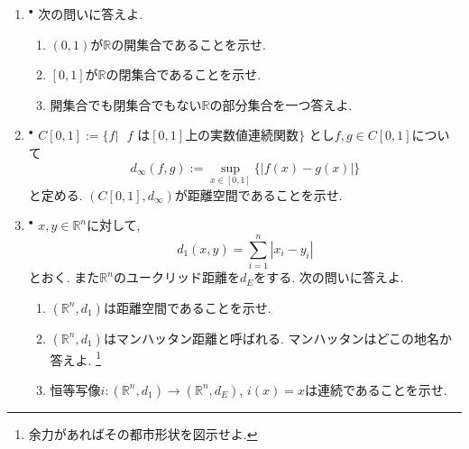\documentclass[dvipdfmx,a4paper,11pt]{article}
\newcommand{\R}{\mathbb{R}}
\theoremstyle{definition}
\begin{document}
\begin{enumerate}[label=\textbf{問}\ref*{sec-euc}.\arabic*]
 \setlength{\parskip}{0cm}
  \setlength{\itemsep}{7pt} 
\item $^{\bullet}$ 次の問いに答えよ.
\begin{enumerate}
 \setlength{\parskip}{0cm}
  \setlength{\itemsep}{0pt} 
\item $(0,1)$が$\R$の開集合であることを示せ.
\item $[0,1]$が$\R$の閉集合であることを示せ.
\item 開集合でも閉集合でもない$\R$の部分集合を一つ答えよ.
\end{enumerate}



\item \label{conti}$^{\bullet}$ 
$C[0,1]:= \{f | \text{ $f$ は$[0,1]$上の実数値連続関数} \}$
とし$f,g \in C[0,1]$について
$$
d_{\infty}(f,g) := \sup_{x \in [0,1]} \{ |f(x) - g(x)|\}
$$
と定める.  $(C[0,1],d_{\infty})$が距離空間であることを示せ.

\item  $^{\bullet}$ $x,y \in \R^n$に対して, 
$$
d_{1}(x,y) = \sum_{i=1}^{n} |x_i - y_i|
$$
とおく. また$\R^n$のユークリッド距離を$d_{E}$をする. 次の問いに答えよ.
\begin{enumerate}
 \setlength{\parskip}{0cm}
  \setlength{\itemsep}{0pt} 
\item $(\R^n, d_{1})$は距離空間であることを示せ. 
\item $(\R^n, d_{1})$はマンハッタン距離と呼ばれる. マンハッタンはどこの地名か答えよ. \footnote{余力があればその都市形状を図示せよ.}
\item 恒等写像$i : (\R^n, d_{1}) \to (\R^n, d_{E})$, $i(x)=x$は連続であることを示せ. 
\end{enumerate}



 


 


\end{enumerate}
\end{document}
